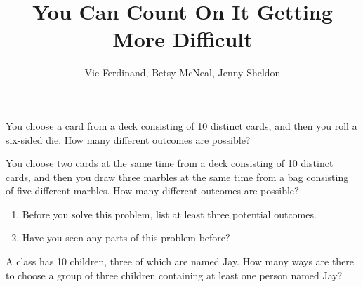 \documentclass{ximera}
\title{You Can Count On It Getting More Difficult}
\author{Vic Ferdinand, Betsy McNeal, Jenny Sheldon}
\begin{document}
\begin{abstract}
\end{abstract}
\maketitle





\begin{problem}
You choose a card from a deck consisting of 10 distinct cards, and then you roll a six-sided die.  How many different outcomes are possible?
\end{problem}

\begin{problem}
You choose two cards at the same time from a deck consisting of 10 distinct cards, and then you draw three marbles at the same time from a bag consisting of five different marbles.  How many different outcomes are possible?
\begin{enumerate}
\item Before you solve this problem, list at least three potential outcomes.
\item Have you seen any parts of this problem before?
\end{enumerate}
\vfill
\end{problem}

\begin{problem}
A class has 10 children, three of which are named Jay.  How many ways are there to choose a group of three children containing at least one person named Jay?
\end{problem}

\newpage
\end{document}
